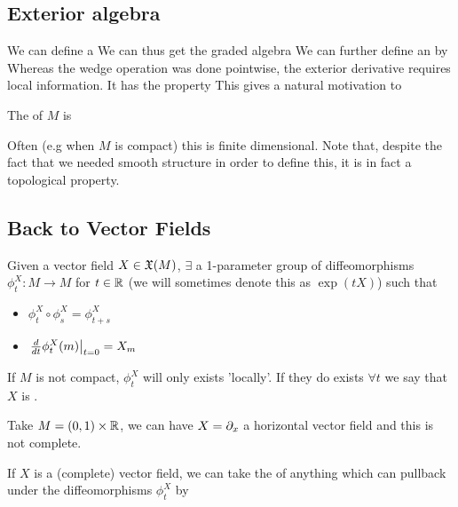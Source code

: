 \documentclass{article}
\begin{document}
\subsection{Exterior algebra}
We can define a  
We can thus get the graded algebra 
We can further define an  by 
Whereas the wedge operation was done pointwise, the exterior derivative requires local information. It has the property
This gives a natural motivation to 
\begin{definition}
The  of $M$ is 
\end{definition}
Often (e.g when $M$ is compact) this is finite dimensional. Note that, despite the fact that we needed smooth structure in order to define this, it is in fact a topological property. 


\subsection{Back to Vector Fields}

Given a vector field $X \in \mathfrak{X}(M)$, $\exists$ a 1-parameter group of diffeomorphisms $\phi_t^X:M \to M$ for $t \in \mathbb{R}$ (we will sometimes denote this as $\exp(tX)$) such that 
\begin{itemize}
    \item $\phi_t^X \circ \phi_s^X = \phi_{t+s}^X$
    \item $\left. \frac{d}{dt} \phi_t^X(m) \right\rvert_{t=0} = X_m$
\end{itemize}

If $M$ is not compact, $\phi_t^X$ will only exists 'locally'. If they do exists $\forall t$ we say that $X$ is . 

\begin{example}
Take $M = (0,1) \times \mathbb{R}$, we can have $X = \partial_x$ a horizontal vector field and this is not complete. 
\end{example}

If $X$ is a (complete) vector field, we can take the  of anything which can pullback under the diffeomorphisms $\phi_t^X$ by 
\end{document}
